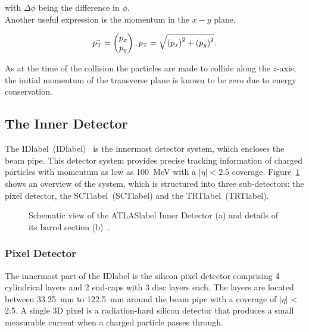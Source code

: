 with $\Delta\phi$ being the difference in $\phi$.\\

Another useful expression is the momentum in the $x-y$ plane, 

\begin{equation}
    \vec{p_{\text{T}}} = \begin{pmatrix} p_x \\ p_y \end{pmatrix}, p_{\text{T}} = \sqrt{\left(p_x\right)^2+\left(p_y\right)^2}.
\end{equation}

As at the time of the collision the particles are made to collide along the $z$-axis, the initial momentum of the transverse plane is known to be zero due to energy conservation.

\subsection{The Inner Detector}

The \acrlong{IDlabel}~(\acrshort{IDlabel})~\cite{CERN-LHCC-97-016,Haywood:331064,Pixelupgrade} is the innermost detector system, which encloses the beam pipe. This detector system provides precise tracking information of charged particles with momentum as low as 100~MeV with a $|\eta|<2.5$ coverage. Figure~\ref{figLHC:ATLASID} shows an overview of the system, which is structured into three sub-detectors: the pixel detector, the \acrlong{SCTlabel}~(\acrshort{SCTlabel}) and the \acrlong{TRTlabel}~(\acrshort{TRTlabel}).

\begin{figure}[htbp]
    \RawFloats
    \begin{center}
    \quad
    \caption{
        Schematic view of the \acrshort{ATLASlabel} Inner Detector (a) and details of its barrel section (b)~\cite{Collaboration_2008}. 
    }
    \label{figLHC:ATLASID}
    \end{center}
\end{figure}

\subsubsection*{Pixel Detector}

The innermost part of the \acrshort{IDlabel} is the silicon pixel detector comprising 4 cylindrical layers and 2 end-caps with 3 disc layers each. The layers are located between 33.25~mm to 122.5~mm around the beam pipe with a coverage of $|\eta|$ < 2.5. A single 3D pixel is a radiation-hard silicon detector that produces a small measurable current when a charged particle passes through.\\

